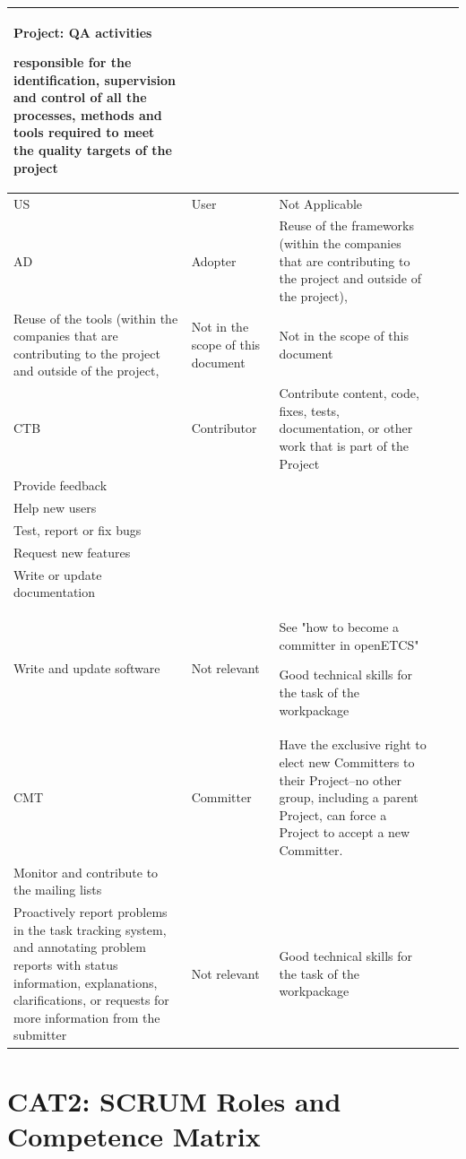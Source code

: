 \documentclass{template/openetcs_article}
\begin{document}
\begin{landscape}
\begin{appendices}
\begin{center}
\begin{longtable}{|m{1cm}|m{}|m{}|m{}|m{}|}
Project: QA activities
\begin{description}
\item responsible for the identification, supervision and control of all the processes, methods and tools required to meet the quality targets of the project
\end{description}
\\\hline
US &
User &
\raggedright
Not Applicable &
&
 \\\hline
AD &
Adopter &
\raggedright
Reuse of the frameworks (within the companies that are contributing to the project and outside of the project),\\
Reuse of the tools (within the companies that are contributing to the project and outside of the project,
&
Not in the scope of this document &
Not in the scope of this document \\\hline
CTB &
Contributor &
\raggedright
Contribute content, code, fixes, tests, documentation, or other work that is part of the Project\\
Provide feedback\\
Help new users\\
Test, report or fix bugs\\
Request new features\\
Write or update documentation\\
Write and update software
&

Not relevant

&
See "how to become a committer in openETCS"

Good technical skills for the task of the workpackage
 \\\hline
CMT &
Committer &
\raggedright
Have the exclusive right to elect new Committers to their Project–no other group, including a parent Project, can force a Project to accept a new Committer.\\
Monitor and contribute to the mailing lists\\
Proactively report problems in the task tracking system, and annotating problem reports with status information, explanations, clarifications, or requests for more information from the submitter
&
Not relevant &
Good technical skills for the task of the workpackage \\\hline
\end{longtable}
\end{center}

\newpage
\section{CAT2: SCRUM Roles and Competence Matrix}
\label{ref:CAT2}


\end{appendices}
\end{landscape}
\end{document}
